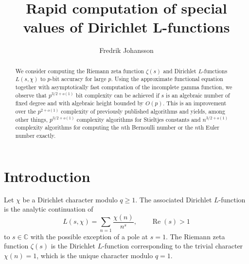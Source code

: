\documentclass[reqno]{amsart}
\newcommand{\Real}{\operatorname{Re}}
\newcommand{\CC}{\mathbb{C}}
\newcommand{\be}{\begin{equation}}
\newcommand{\ee}{\end{equation}}
\theoremstyle{definition}
\begin{document}
\title{Rapid computation of special values of Dirichlet L-functions}

\author{Fredrik Johansson}
\address{Inria Bordeaux, 33400 Talence, France}



\begin{abstract}
We consider computing the Riemann zeta function $\zeta(s)$
and Dirichlet $L$-functions $L(s,\chi)$
to $p$-bit accuracy for large $p$.
Using the approximate functional equation together
with asymptotically fast computation of the incomplete gamma function,
we observe that $p^{3/2+o(1)}$ bit complexity can be
achieved if $s$ is an algebraic number of fixed degree
and with algebraic height bounded by $O(p)$.
This is an improvement over the $p^{2+o(1)}$ complexity of previously published algorithms
and yields, among other things, $p^{3/2+o(1)}$ complexity algorithms for Stieltjes
constants and $n^{3/2+o(1)}$ complexity 
algorithms for computing the $n$th Bernoulli number or the $n$th Euler number exactly.
\end{abstract}


\maketitle






\section{Introduction}

Let $\chi$ be a Dirichlet character modulo $q \ge 1$.
The associated Dirichlet $L$-function is
the analytic continuation of
\be
L(s,\chi) = \sum_{n=1} \frac{\chi(n)}{n^s}, \quad \quad \Real(s) > 1
\label{eq:lseries}
\ee
to $s \in \CC$ with the possible exception of a pole at $s = 1$.
The Riemann zeta function $\zeta(s)$ is
the Dirichlet $L$-function corresponding to the trivial character $\chi(n) = 1$,
which is the unique character modulo $q = 1$.
\end{document}
